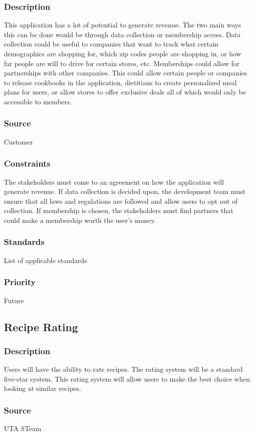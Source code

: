 \subsubsection{Description}
This application has a lot of potential to generate revenue. The two main ways this can be done would be through data collection or membership access. Data collection could be useful to companies that want to track what certain demographics are shopping for, which zip codes people are shopping in, or how far people are will to drive for certain stores, etc. Memberships could allow for partnerships with other companies. This could allow certain people or companies to release cookbooks in the application, dietitians to create personalized meal plans for users, or allow stores to offer exclusive deals all of which would only be accessible to members.
\subsubsection{Source}
Customer
\subsubsection{Constraints}
The stakeholders must come to an agreement on how the application will generate revenue. If data collection is decided upon, the development team must ensure that all laws and regulations are followed and allow users to opt out of collection. If membership is chosen, the stakeholders must find partners that could make a membership worth the user's money.
\subsubsection{Standards}
List of applicable standards
\subsubsection{Priority}
Future

\subsection{Recipe Rating}
\subsubsection{Description}
Users will have the ability to rate recipes. The rating system will be a standard five-star system. This rating system will allow users to make the best choice when looking at similar recipes.
\subsubsection{Source}
UTA STeam

